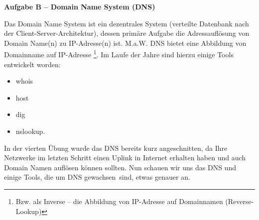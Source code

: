 \documentclass[paper=a4,fontsize=11pt]{scrartcl}%
\numberwithin{equation}{section}
\begin{document}
\begin{center}\Large{\textbf{Aufgabe B -- Domain Name System (DNS)}}\end{center}\vskip0.25in
Das Domain Name System ist ein dezentrales System (verteilte Datenbank nach der Client-Server-Architektur), dessen primäre Aufgabe die Adressauflösung von Domain Name(n) zu IP-Adresse(n) ist. M.a.W. DNS bietet eine Abbildung von Domainname auf IP-Adresse \footnote{Bzw. als Inverse -- die Abbildung von IP-Adresse auf Domainnamen (Reverse-Lookup)}. Im Laufe der Jahre sind hierzu einige Tools entwickelt worden: 
\begin{multicols}{4}
\begin{itemize}
	\item whois 
	\item host
	\item dig
	\item nslookup.
\end{itemize}
\end{multicols}
In der vierten Übung wurde das DNS bereits kurz angeschnitten, da Ihre Netzwerke im letzten Schritt einen Uplink in Internet erhalten haben und auch Domain Namen auflösen können sollten. Nun schauen wir uns das DNS und einige Tools, die um DNS \glqq gewachsen\grqq\ sind, etwas genauer an.
\end{document}
